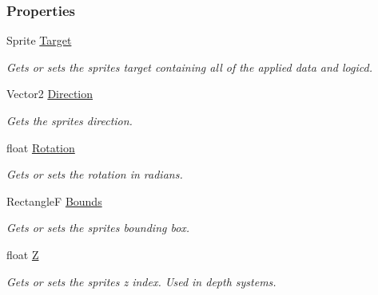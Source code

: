 \subsubsection*{Properties}
\begin{DoxyCompactItemize}
\item 
Sprite \hyperlink{class_m_b2_d_1_1_entity_component_1_1_sprite_transform_a31edaa3c4ce6d37d74b639032be4f845}{Target}
\begin{DoxyCompactList}\small\item\em Gets or sets the sprites target containing all of the applied data and logicd. \end{DoxyCompactList}\item 
Vector2 \hyperlink{class_m_b2_d_1_1_entity_component_1_1_sprite_transform_a0cd51eee71ba1b1f548e0950c05a8e12}{Direction}
\begin{DoxyCompactList}\small\item\em Gets the sprites direction. \end{DoxyCompactList}\item 
float \hyperlink{class_m_b2_d_1_1_entity_component_1_1_sprite_transform_a6220a2c6ca43613d77065ec9eddc99dd}{Rotation}
\begin{DoxyCompactList}\small\item\em Gets or sets the rotation in radians. \end{DoxyCompactList}\item 
RectangleF \hyperlink{class_m_b2_d_1_1_entity_component_1_1_sprite_transform_a1b712a2eaabf39b3aa697054ba4a1904}{Bounds}
\begin{DoxyCompactList}\small\item\em Gets or sets the sprites bounding box. \end{DoxyCompactList}\item 
float \hyperlink{class_m_b2_d_1_1_entity_component_1_1_sprite_transform_a312bac0f6e60d258adce879f4d3da2e7}{Z}
\begin{DoxyCompactList}\small\item\em Gets or sets the sprites z index. Used in depth systems. \end{DoxyCompactList}\end{DoxyCompactItemize}


